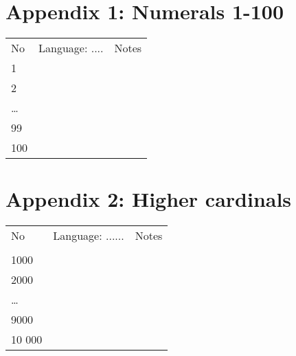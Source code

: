 \section*{Appendix 1: Numerals 1-100}

\begin{tabular}{lll}

No & Language: .... & Notes\\
1 &  & \\
2 &  & \\
{\dots} & & \\
99 &  & \\
100 &  & \\
\end{tabular}


\section*{Appendix 2: Higher cardinals}

\begin{tabular}{lll}

No & Language: ...... & Notes\\
 &  & \\
1000 &  & \\
2000 &  & \\
{\dots} & & \\
9000 &  & \\
10 000 &  & \\
\end{tabular}


